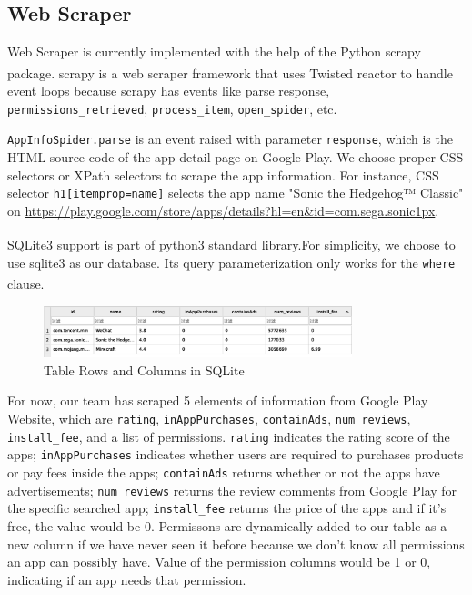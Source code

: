 \documentclass[12pt, a4paper]{article}
\newcommand{\code}[1]{\texttt{#1}}
\begin{document}
\subsection{Web Scraper}
Web Scraper is currently implemented with the help of the Python scrapy package\textsuperscript{\cite{scrapy}}. scrapy is a web scraper framework that uses Twisted reactor\textsuperscript{\cite{reactor}} to handle event loops because scrapy has events like parse response, \code{permissions\linebreak[2]\_retrieved}, \code{process\_item}, \code{open\_spider}, etc.

\code{AppInfoSpider.parse} is an event raised with parameter \code{response}, which is the HTML source code of the app detail page on Google Play. We choose proper CSS selectors or XPath selectors to scrape the app information. For instance, CSS selector \code{h1[itemprop=name]} selects the app name "Sonic the Hedgehog™ Classic" on \url{https://play.google.com/store/apps/details?hl=en&id=com.sega.sonic1px}.

SQLite3 support is part of python3 standard library.\textsuperscript{\cite{python-sqlite}}For simplicity, we choose to use sqlite3 as our database. Its query parameterization only works for the \code{where} clause.\textsuperscript{\cite{sqliteC++}}

\begin{figure}[ht]
\centering
\includegraphics[width=0.8\textwidth]{critical_information.png}
\caption{Table Rows and Columns in SQLite}
\label{fig:critical-information}
\end{figure}

For now, our team has scraped 5 elements of information from Google Play Website, which are \code{rating}, \code{inAppPurchases}, \code{containAds}, \code{num\linebreak[4]\_reviews}, \code{install\_fee}, and a list of permissions. \code{rating} indicates the rating score of the apps; \code{inAppPurchases} indicates whether users are required to purchases products or pay fees inside the apps; \code{containAds} returns whether or not the apps have advertisements; \code{num\linebreak[2]\_reviews} returns the review comments from Google Play for the specific searched app; \code{install\_fee} returns the price of the apps and if it’s free, the value would be 0. Permissons are dynamically added to our table as a new column if we have never seen it before because we don't know all permissions an app can possibly have. Value of the permission columns would be 1 or 0, indicating if an app needs that permission.
\end{document}
